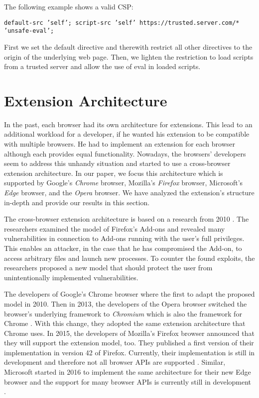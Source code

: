	The following example shows a valid CSP:
	\begin{center}
		\texttt{default-src 'self'; script-src 'self' https://trusted.server.com/* 'unsafe-eval';}
	\end{center}
	First we set the default directive and therewith restrict all other directives to the origin of the underlying web page. Then, we lighten the restriction to load scripts from a trusted server and allow the use of eval in loaded scripts.

\newpage
\section{Extension Architecture}

	In the past, each browser had its own architecture for extensions. This lead to an additional workload for a developer, if he wanted his extension to be compatible with multiple browsers. He had to implement an extension for each browser although each provides equal functionality. Nowadays, the browsers' developers seem to address this unhandy situation and started to use a cross-browser extension architecture. In our paper, we focus this architecture which is supported by Google's \textit{Chrome} browser, Mozilla's \textit{Firefox} browser, Microsoft's \textit{Edge} browser, and the \textit{Opera} browser. We have analyzed the extension's structure in-depth and provide our results in this section.

	The cross-browser extension architecture is based on a research from 2010 \cite{Barth10protectingbrowsers}. The researchers examined the model of Firefox's Add-ons and revealed many vulnerabilities in connection to Add-ons running with the user's full privileges. This enables an attacker, in the case that he has compromised the Add-on, to access arbitrary files and launch new processes. To counter the found exploits, the researchers proposed a new model that should protect the user from unintentionally implemented vulnerabilities.

	The developers of Google's Chrome browser where the first to adapt the proposed model in 2010. Then in 2013, the developers of the Opera browser switched the browser's underlying framework to \textit{Chromium} which is also the framework for Chrome \cite{operaBlogSwitchToChromium}. With this change, they adopted the same extension architecture that Chrome uses. In 2015, the developers of Mozilla's Firefox browser announced that they will support the extension model, too. They published a first version of their implementation in version 42 of Firefox. Currently, their implementation is still in development and therefore not all browser APIs are supported \cite{mozillaWebExtensionStatus}. Similar, Microsoft started in 2016 to implement the same architecture for their new Edge browser and the support for many browser APIs is currently still in development \cite{edgeBrowserApiStatus}.

